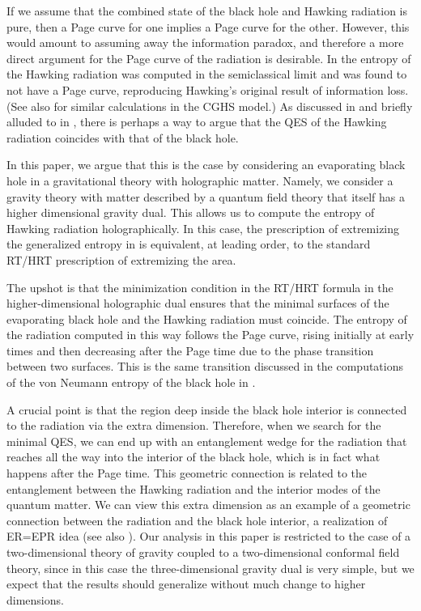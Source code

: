 \documentclass[12pt]{article}
\begin{document}
If we assume that the combined state of the black hole and Hawking radiation is pure, then a Page curve for one implies a Page curve for the other. 
However, this would amount to assuming away the information paradox, and therefore a more direct argument for the Page curve of the radiation is desirable. 
In \cite{Almheiri:2019psf} the entropy of the Hawking radiation was computed in the semiclassical limit and was found to not have a Page curve, reproducing Hawking's original result of information loss.
(See also \cite{Fiola:1994ir} for similar calculations in the CGHS model.) 
As discussed in \cite{Penington:2019npb} and briefly alluded to in \cite{Almheiri:2019psf, Hayden:2018khn}, there is perhaps a way to argue that the QES of the Hawking radiation coincides with that of the black hole.

In this paper, we argue that this is the case by  considering an evaporating black hole in a gravitational theory with holographic matter. 
Namely, we consider a gravity theory with matter described by a quantum field theory that itself has a higher dimensional gravity dual. 
This allows us to compute the entropy of Hawking radiation holographically.
In this case, the prescription of extremizing the generalized entropy in \cite{Engelhardt:2014gca} is equivalent, at leading order, to the standard RT/HRT prescription \cite{Ryu:2006bv,Hubeny:2007xt} of extremizing the area.

The upshot is that the minimization condition in the RT/HRT formula in the higher-dimensional holographic dual ensures that the minimal surfaces of the evaporating black hole and the Hawking radiation must coincide.
The entropy of the radiation computed in this way follows the Page curve, rising initially at early times and then decreasing after the Page time due to the phase transition between two surfaces.  
This is the same transition discussed in the computations of the von Neumann entropy of the black hole in \cite{Penington:2019npb,Almheiri:2019psf}. 

A crucial point is that the region deep inside the black hole interior is connected to the radiation via the extra dimension. 
Therefore, when we search for the minimal QES, we can end up with an entanglement wedge for the radiation that reaches all the way into the interior of the black hole, which is in fact what happens after the Page time. 
This geometric connection is related to the entanglement between the Hawking radiation and the interior modes of the quantum matter. 
We can view this extra dimension as an example of a geometric connection between the radiation and the black hole interior, a realization of ER=EPR \cite{Maldacena:2013xja, Maldacena:2013t1} idea (see also \cite{Susskind:2012uw, Papadodimas:2012aq}).
Our analysis in this paper is restricted to the case of a two-dimensional theory of gravity coupled to a two-dimensional conformal field theory, since in this case the  three-dimensional  gravity dual is very simple, but we expect that the results should generalize without much change to higher dimensions. 
\end{document}
